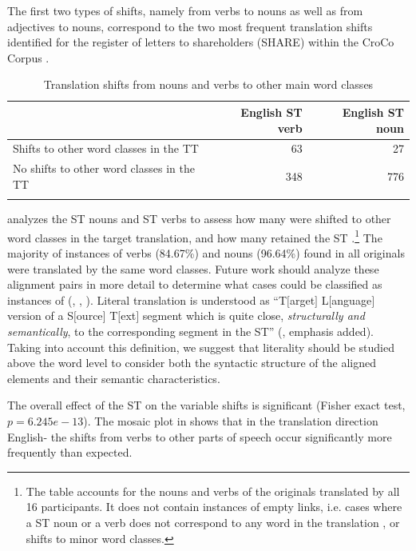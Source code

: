 \documentclass[output=paper]{LSP/langsci}
\begin{document}
The first two types of shifts, namely from verbs to nouns as well as from adjectives to nouns, correspond to the two most frequent translation shifts identified for the register of letters to shareholders (SHARE) within the CroCo Corpus \citep[50]{Culo2008}. 

\begin{table}[h]
\begin{tabularx}{\textwidth}{Xrr} 
\lsptoprule
	&  English ST verb &  English ST noun\\ \midrule
Shifts to other word classes in the TT &  63 &  27\\
No shifts to other word classes in the TT &  348 &  776\\
\lspbottomrule
\end{tabularx}
\caption{Translation shifts from nouns and verbs to other main word classes}
\label{serbinaetal:tab:5}
\end{table}
  analyzes  the  ST nouns and ST verbs to assess how many were shifted to other word classes in the target translation, and how many retained the ST .\footnote{The table accounts for the nouns and verbs of the originals translated by all 16 participants. It does not contain instances of empty links, i.e. cases where a ST noun or a verb does not correspond to any word in the translation \citep{Culo2012}, or shifts to minor word classes.}  The majority of instances of verbs (84.67\%) and nouns (96.64\%) found in all originals were translated by the same word classes. Future work should analyze these alignment pairs in more detail to determine what cases could be classified as instances of  (\citealt{TirkkonenCondit2005}, \citealt{Schaeffer2013Shared}, \citealt{Halverson2015}). Literal translation is understood as ``T$[$ar\-get$]$ L$[$anguage$]$ version of a S$[$ource$]$ T$[$ext$]$ segment which is quite close, \textit{structurally and semantically}, to the corresponding segment in the ST'' (\citealt[232]{Englund2005}, emphasis added). Taking into account this definition, we suggest that literality should be studied above the word level to consider both the syntactic structure of the aligned elements and their semantic characteristics. 

The overall effect of the ST  on the variable shifts is significant (Fisher exact test, $p=6.245e-13$). The mosaic plot in  shows that in the translation direction English- the shifts from verbs to other parts of speech occur significantly more frequently than expected. 
\end{document}
